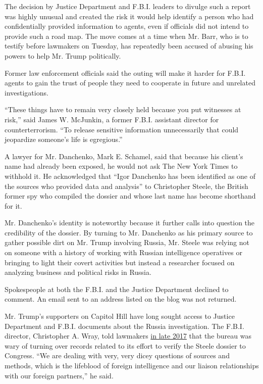 The decision by Justice Department and F.B.I. leaders to divulge such a
report was highly unusual and created the risk it would help identify a
person who had confidentially provided information to agents, even if
officials did not intend to provide such a road map. The move comes at a
time when Mr. Barr, who is to testify before lawmakers on Tuesday, has
repeatedly been accused of abusing his powers to help Mr. Trump
politically.

Former law enforcement officials said the outing will make it harder for
F.B.I. agents to gain the trust of people they need to cooperate in
future and unrelated investigations.

``These things have to remain very closely held because you put
witnesses at risk,'' said James W. McJunkin, a former F.B.I. assistant
director for counterterrorism. ``To release sensitive information
unnecessarily that could jeopardize someone's life is egregious.''

A lawyer for Mr. Danchenko, Mark E. Schamel, said that because his
client's name had already been exposed, he would not ask The New York
Times to withhold it. He acknowledged that ``Igor Danchenko has been
identified as one of the sources who provided data and analysis'' to
Christopher Steele, the British former spy who compiled the dossier and
whose last name has become shorthand for it.

Mr. Danchenko's identity is noteworthy because it further calls into
question the credibility of the dossier. By turning to Mr. Danchenko as
his primary source to gather possible dirt on Mr. Trump involving
Russia, Mr. Steele was relying not on someone with a history of working
with Russian intelligence operatives or bringing to light their covert
activities but instead a researcher focused on analyzing business and
political risks in Russia.

Spokespeople at both the F.B.I. and the Justice Department declined to
comment. An email sent to an address listed on the blog was not
returned.

Mr. Trump's supporters on Capitol Hill have long sought access to
Justice Department and F.B.I. documents about the Russia investigation.
The F.B.I. director, Christopher A. Wray, told lawmakers
\href{https://hankjohnson.house.gov/media-center/press-releases/rep-johnson-questions-fbi-director-judiciary-hearing}{in
late 2017} that the bureau was wary of turning over records related to
its effort to verify the Steele dossier to Congress. ``We are dealing
with very, very dicey questions of sources and methods, which is the
lifeblood of foreign intelligence and our liaison relationships with our
foreign partners,'' he said.

